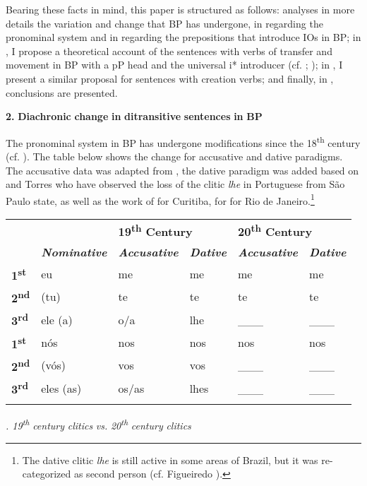 \documentclass[output=paper,modfonts,nonflat]{langsci/langscibook}
\begin{document}
Bearing these facts in mind, this paper is structured as follows:  analyses in more details the variation and change that BP has undergone, in  regarding the pronominal system and in  regarding the prepositions that introduce IOs in BP; in , I propose a theoretical account of the sentences with verbs of transfer and movement in BP with a pP head and the universal i* introducer (cf. \citealt{Wood2012}; \citealt{WoodMarantz2017}); in , I present a similar proposal for sentences with creation verbs; and finally, in , conclusions are presented.

\textbf{2.} \textbf{Diachronic} \textbf{change} \textbf{in} \textbf{ditransitive} \textbf{sentences} \textbf{in} \textbf{BP}

The pronominal system in BP has undergone modifications since the 18\textsuperscript{th} century (cf. \citealt{KatoEtAl2009}). The table below shows the change for accusative and dative paradigms. The accusative data was adapted from \citet[246]{KatoEtAl2009}, the dative paradigm was added based on \citet{Calindro2015} and Torres \citet{MoraisBerlinck2006} who have observed the loss of the clitic \textit{lhe} in Portuguese from São Paulo state, as well as the work of \citet{Berlinck1997} for Curitiba, \citet{Silveira1999} for \citet{FlorianopolisFreire2005} for Rio de Janeiro.\footnote{\textrm{The dative clitic} \textrm{\textit{lhe}} \textrm{is still active in some areas of Brazil, but it was re-categorized as second person (cf. Figueiredo \citealt{Silva2007}).}}

\tablefirsthead{}

\tabletail{}
\tablelasttail{}
\begin{tabularx}{\textwidth}{XXXXXX} &  & \multicolumn{2}{X}{{\bfseries 19\textsuperscript{th} Century}} & \multicolumn{2}{X}{{\bfseries 20\textsuperscript{th} Century}}\\
\lsptoprule
& \textbf{\textit{Nominative}} & \textbf{\textit{Accusative}} & \textbf{\textit{Dative}} & \textbf{\textit{Accusative}} & \textbf{\textit{Dative}}\\
{\bfseries 1\textsuperscript{st} } & eu & me & me & me & me\\
{\bfseries 2\textsuperscript{nd}}  & (tu) & te & te & te & te\\
{\bfseries 3\textsuperscript{rd}}  & ele (a) & o/a & lhe & \_\_\_ & \_\_\_\\
{\bfseries 1\textsuperscript{st}}  & nós & nos & nos & nos & nos\\
{\bfseries 2\textsuperscript{nd}} & (vós) & vos & vos & \_\_\_ & \_\_\_\\
{\bfseries 3\textsuperscript{rd}}  & eles (as) & os/as & lhes & \_\_\_ & \_\_\_\\
\lspbottomrule
\end{tabularx}
\textit{. 19}\textit{\textsuperscript{th}} \textit{century} \textit{clitics} \textit{vs.} \textit{20\textsuperscript{th}} \textit{century} \textit{clitics}
\end{document}
